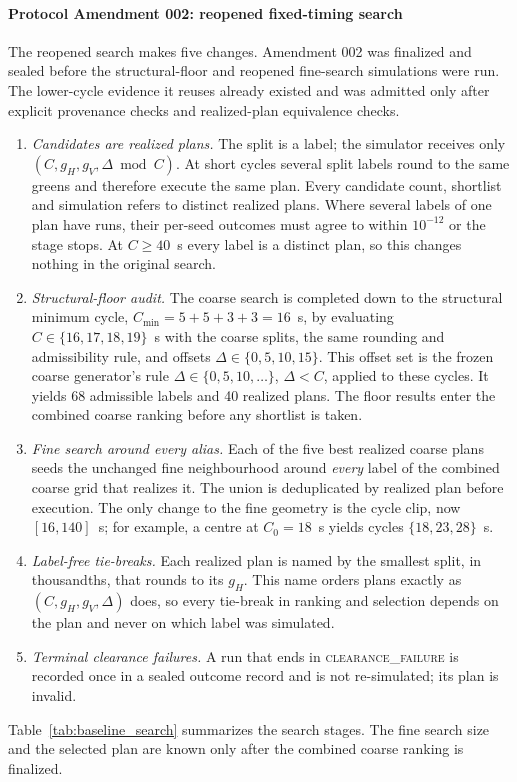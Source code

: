 \documentclass[review,12pt]{elsarticle}
\begin{document}
\paragraph{Protocol Amendment 002: reopened fixed-timing search} The
reopened search makes five changes. Amendment 002 was finalized and
sealed before the structural-floor and reopened fine-search simulations
were run. The lower-cycle evidence it reuses already existed and was
admitted only after explicit provenance checks and realized-plan
equivalence checks.
\begin{enumerate}[label=(\alph*)]
\item \emph{Candidates are realized plans.} The split is a label; the
simulator receives only $(C,g_H,g_V,\Delta\bmod C)$. At short cycles
several split labels round to the same greens and therefore execute the
same plan. Every candidate count, shortlist and simulation refers to
distinct realized plans. Where several labels of one plan have runs,
their per-seed outcomes must agree to within $10^{-12}$ or the stage
stops. At $C\geq40$~s every label is a distinct plan, so this changes
nothing in the original search.
\item \emph{Structural-floor audit.} The coarse search is completed down
to the structural minimum cycle,
$C_{\min}=5+5+3+3=16$~s, by evaluating $C\in\{16,17,18,19\}$~s with the
coarse splits, the same rounding and admissibility rule, and offsets
$\Delta\in\{0,5,10,15\}$. This offset set is the frozen coarse
generator's rule $\Delta\in\{0,5,10,\dots\}$, $\Delta<C$, applied to
these cycles. It yields 68 admissible labels and 40 realized plans. The
floor results enter the combined coarse ranking before any shortlist is
taken.
\item \emph{Fine search around every alias.} Each of the five best
realized coarse plans seeds the unchanged fine neighbourhood around
\emph{every} label of the combined coarse grid that realizes it. The
union is deduplicated by realized plan before execution. The only change
to the fine geometry is the cycle clip, now $[16,140]$~s; for example, a
centre at $C_0=18$~s yields cycles $\{18,23,28\}$~s.
\item \emph{Label-free tie-breaks.} Each realized plan is named by the
smallest split, in thousandths, that rounds to its $g_H$. This name
orders plans exactly as $(C,g_H,g_V,\Delta)$ does, so every tie-break in
ranking and selection depends on the plan and never on which label was
simulated.
\item \emph{Terminal clearance failures.} A run that ends in
\textsc{clearance\_failure} is recorded once in a sealed outcome record
and is not re-simulated; its plan is invalid.
\end{enumerate}
Table~\ref{tab:baseline_search} summarizes the search stages. The fine
search size and the selected plan are known only after the combined
coarse ranking is finalized.
\end{document}
